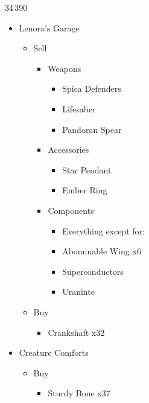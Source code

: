	\begin{shop}{34\,390}
		\begin{itemize}
			\item Lenora's Garage
			      \begin{itemize}
				      \item Sell
				            \begin{itemize}
					            \item Weapons
					                  \begin{itemize}
						                  \item Spica Defenders
						                  \item Lifesaber
						                  \item Pandoran Spear
					                  \end{itemize}
					            \item Accessories
					                  \begin{itemize}
						                  \item Star Pendant
						                  \item Ember Ring
					                  \end{itemize}
					            \item Components
					                  \begin{itemize}
						                  \item Everything except for:
						                  \item Abominable Wing x6
						                  \item Superconductors
						                  \item Uraninte
					                  \end{itemize}
				            \end{itemize}
				      \item Buy
				            \begin{itemize}
					            \item Crankshaft x32
				            \end{itemize}
			      \end{itemize}
			\item Creature Comforts
			      \begin{itemize}
				      \item Buy
				            \begin{itemize}
					            \item Sturdy Bone x37
				            \end{itemize}

\end{itemize}
\end{itemize}
\end{shop}

